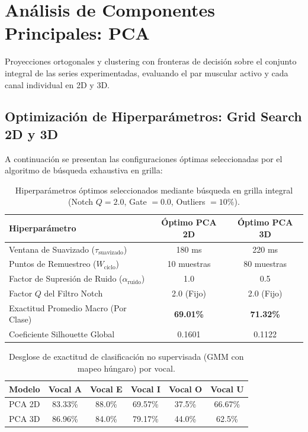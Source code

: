 \documentclass[11pt,a4paper]{article}
\begin{document}
\newpage
\section{Análisis de Componentes Principales: PCA}
Proyecciones ortogonales y clustering con fronteras de decisión sobre el conjunto integral de las series experimentadas, evaluando el par muscular activo y cada canal individual en 2D y 3D.

\subsection{Optimización de Hiperparámetros: Grid Search 2D y 3D}
A continuación se presentan las configuraciones óptimas seleccionadas por el algoritmo de búsqueda exhaustiva en grilla:
\begin{table}[H]
\centering
\begin{tabular}{lcc}
\toprule
\textbf{Hiperparámetro} & \textbf{Óptimo PCA 2D} & \textbf{Óptimo PCA 3D} \\
\midrule
Ventana de Suavizado ($\tau_{\text{suavizado}}$) & 180 ms & 220 ms \\
Puntos de Remuestreo ($W_{\text{ciclo}}$) & 10 muestras & 80 muestras \\
Factor de Supresión de Ruido ($\alpha_{\text{ruido}}$) & 1.0 & 0.5 \\
Factor $Q$ del Filtro Notch & 2.0 (Fijo) & 2.0 (Fijo) \\
\midrule
Exactitud Promedio Macro (Por Clase) & \textbf{69.01\%} & \textbf{71.32\%} \\
Coeficiente Silhouette Global & 0.1601 & 0.1122 \\
\bottomrule
\end{tabular}
\caption{Hiperparámetros óptimos seleccionados mediante búsqueda en grilla integral (Notch $Q=2.0$, Gate $=0.0$, Outliers $=10\%$).}
\end{table}

\begin{table}[H]
\centering
\begin{tabular}{cccccc}
\toprule
\textbf{Modelo} & \textbf{Vocal A} & \textbf{Vocal E} & \textbf{Vocal I} & \textbf{Vocal O} & \textbf{Vocal U} \\
\midrule
PCA 2D & 83.33\% & 88.0\% & 69.57\% & 37.5\% & 66.67\% \\
PCA 3D & 86.96\% & 84.0\% & 79.17\% & 44.0\% & 62.5\% \\
\bottomrule
\end{tabular}
\caption{Desglose de exactitud de clasificación no supervisada (GMM con mapeo húngaro) por vocal.}
\end{table}
\end{document}
